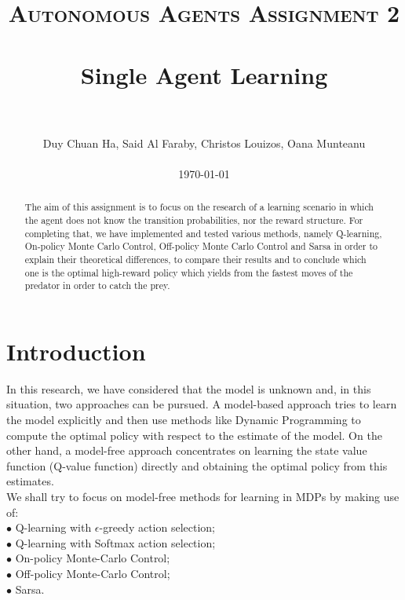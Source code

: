\documentclass[paper=a4, fontsize=11pt]{scrartcl}
\title{
		\usefont{OT1}{bch}{b}{n}
		\normalfont \normalsize \textsc{Autonomous Agents Assignment 2} \\ [25pt]
		\horrule{0.5pt} \\[0.4cm]
		\huge Single Agent Learning \\
		\horrule{2pt} \\[0.5cm]
}
\author{
        Duy Chuan Ha, Said Al Faraby, Christos Louizos, Oana Munteanu %
        \\
        \\
        \today
}
\date{}
\numberwithin{equation}{section}		%
\numberwithin{figure}{section}			%
\numberwithin{table}{section}				%
\begin{document}
\maketitle
\bigskip
\begin{abstract}
The aim of this assignment is to focus on the research of a learning scenario in which the agent does not know the transition probabilities, nor the reward structure. For completing that, we have implemented and tested various methods, namely  Q-learning, On-policy Monte Carlo Control, Off-policy Monte Carlo Control and Sarsa in order to explain their theoretical differences, to compare their results and to conclude which one is the optimal high-reward policy which yields from the fastest moves of the predator in order to catch the prey.\\
\end{abstract}

\section{Introduction}
In this research, we have considered that the model is unknown and, in this situation, two approaches can be pursued. A model-based approach tries to learn the model explicitly and then use methods like Dynamic Programming to compute the optimal policy with respect to the estimate of the model. On the other hand, a model-free approach concentrates on learning the state value function (Q-value function) directly and obtaining the optimal policy from this estimates.\\
We shall try to focus on model-free methods for learning in MDPs by making use of: \\
$\bullet$ Q-learning with $\epsilon$-greedy action selection; \\
$\bullet$ Q-learning with Softmax action selection; \\
$\bullet$ On-policy Monte-Carlo Control; \\
$\bullet$ Off-policy Monte-Carlo Control; \\
$\bullet$ Sarsa.
\end{document}
